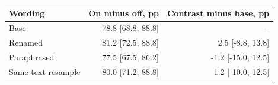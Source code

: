 \begin{tabular}{lrr}
\toprule
Wording & On minus off, pp & Contrast minus base, pp \\
\midrule
Base & 78.8 [68.8, 88.8] & -- \\
Renamed & 81.2 [72.5, 88.8] & 2.5 [-8.8, 13.8] \\
Paraphrased & 77.5 [67.5, 86.2] & -1.2 [-15.0, 12.5] \\
Same-text resample & 80.0 [71.2, 88.8] & 1.2 [-10.0, 12.5] \\
\bottomrule
\end{tabular}
